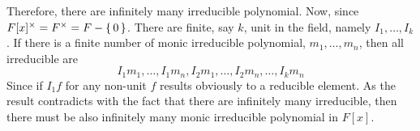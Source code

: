 \documentclass{report}
\begin{document}
{\begin{enumerate}[a]
        Therefore, there are infinitely many irreducible polynomial.
        Now, since $F[x]^\times = F^\times = F - \left\{\, 0 \,\right\}$. There are finite, say $k$, unit in the field, namely $I_1, \ldots, I_k$.
        If there is a finite number of monic irreducible polynomial, $m_1, \ldots, m_n$, then all irreducible are 
        \[ I_1m_1, \ldots, I_1m_n, I_2m_1, \ldots, I_2m_n, \ldots, I_km_n \]
        Since if $I_1 f$ for any non-unit $f$ results obviously to a reducible element.
        As the result contradicts with the fact that there are infinitely many irreducible, then there must be also infinitely 
        many monic irreducible polynomial in $F[x]$.
    \end{enumerate}
  }
\end{document}
